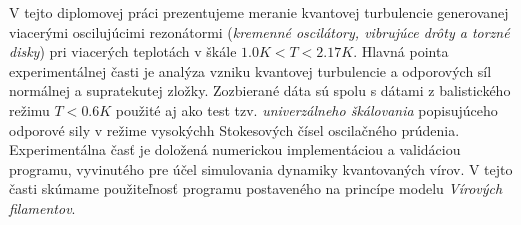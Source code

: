 V tejto diplomovej práci prezentujeme meranie kvantovej turbulencie generovanej viacerými oscilujúcimi rezonátormi (\textit{kremenné oscilátory, vibrujúce drôty a torzné disky}) pri viacerých teplotách v škále  $1.0\unit{K} < T < 2.17\unit{K}$. Hlavná pointa experimentálnej časti je analýza vzniku kvantovej turbulencie a odporových síl normálnej a supratekutej zložky. Zozbierané dáta sú spolu s dátami z balistického režimu  $T < 0.6\unit{K}$ použité aj ako test tzv.
\textit{univerzálneho škálovania} popisujúceho odporové sily v režime vysokýchh Stokesových čísel oscilačného prúdenia.\\
Experimentálna časť je doložená numerickou implementáciou a validáciou programu, vyvinutého pre účel simulovania dynamiky kvantovaných vírov. V tejto časti skúmame použiteľnosť programu postaveného na princípe modelu \textit{Vírových filamentov}.

